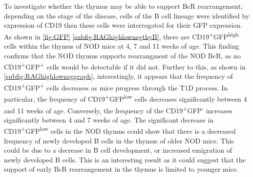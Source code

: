 To investigate whether the thymus may be able to support BcR rearrangement, depending on the stage of the disease, cells of the B cell lineage were identified by expression of CD19 then these cells were interrogated for their GFP expression.
As shown in \cref{fig:GFP} \ref{subfig:RAGhighlownegthyB}, there are CD19\textsuperscript{+}GFP\textsuperscript{high} cells within the thymus of NOD mice at 4, 7 and 11 weeks of age.
This finding confirms that the NOD thymus supports rearrangment of the NOD BcR, as no CD19\textsuperscript{+}GFP\textsuperscript{+} cells would be detectable if it did not.
Further to this, as shown in \cref{subfig:RAGhighlowneggraph}, interestingly, it appears that the frequency of CD19\textsuperscript{+}GFP\textsuperscript{+} cells decreases as mice progress through the T1D process.
In particular, the frequency of CD19\textsuperscript{+}GFP\textsuperscript{low} cells decreases significantly between 4 and 11 weeks of age.
Conversely, the frequency of the CD19\textsuperscript{+}GFP\textsuperscript{-} increases significantly between 4 and 7 weeks of age.
The significant decrease in CD19\textsuperscript{+}GFP\textsuperscript{low} cells in the NOD thymus could show that there is a decreased frequency of newly developed B cells in the thymus of older NOD mice.
This could be due to a decrease in B cell development, or increased emigration of newly developed B cells.
This is an interesting result as it could suggest that the support of early BcR rearrangement in the thymus is limited to younger mice.



